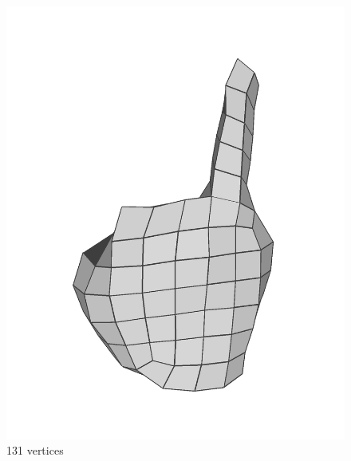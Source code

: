 \begin{figure}
\centering
\begin{minipage}{0.24\linewidth}
\centering
\includegraphics[width=\linewidth]{quadriflow/evaluation/coarse01.png}
131 vertices
\end{minipage}
\begin{minipage}{0.24\linewidth}
\centering

\end{minipage}
\end{figure}
